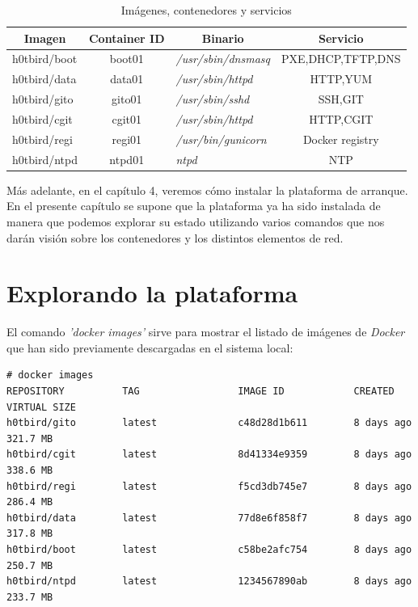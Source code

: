 \documentclass[a4paper,12pt,spanish,final]{epsc_tfc_pfc}
\begin{document}
\vspace{30pt}

\begin{table}[h]
\centering
\begin{tabular}{|l|c|l|c|}
\hline
\multicolumn{1}{|c|}{\textbf{Imagen}}    & \textbf{Container ID} & \multicolumn{1}{c|}{\textbf{Binario}} & \textbf{Servicio} \\ \hline
h0tbird/boot                             & boot01                & \textit{/usr/sbin/dnsmasq}            & PXE,DHCP,TFTP,DNS \\ \hline
h0tbird/data                             & data01                & \textit{/usr/sbin/httpd}              & HTTP,YUM          \\ \hline
h0tbird/gito                             & gito01                & \textit{/usr/sbin/sshd}               & SSH,GIT           \\ \hline
h0tbird/cgit                             & cgit01                & \textit{/usr/sbin/httpd}              & HTTP,CGIT         \\ \hline
h0tbird/regi                             & regi01                & \textit{/usr/bin/gunicorn}            & Docker registry   \\ \hline
h0tbird/ntpd                             & ntpd01                & \textit{ntpd}                         & NTP               \\ \hline
\end{tabular}
\caption{Imágenes, contenedores y servicios}
\end{table}

Más adelante, en el capítulo 4, veremos cómo instalar la plataforma de arranque. En el presente capítulo se supone que la plataforma ya ha sido instalada de manera que podemos explorar su estado utilizando varios comandos que nos darán visión sobre los contenedores y los distintos elementos de red.

\section{Explorando la plataforma}

El comando \emph{'docker images'} sirve para mostrar el listado de imágenes de \emph{Docker} que han sido previamente descargadas en el sistema local:\\

\begin{lstlisting}[style=dnsmasq]
# docker images
REPOSITORY          TAG                 IMAGE ID            CREATED             VIRTUAL SIZE
h0tbird/gito        latest              c48d28d1b611        8 days ago          321.7 MB
h0tbird/cgit        latest              8d41334e9359        8 days ago          338.6 MB
h0tbird/regi        latest              f5cd3db745e7        8 days ago          286.4 MB
h0tbird/data        latest              77d8e6f858f7        8 days ago          317.8 MB
h0tbird/boot        latest              c58be2afc754        8 days ago          250.7 MB
h0tbird/ntpd        latest              1234567890ab        8 days ago          233.7 MB
\end{lstlisting}
\end{document}
